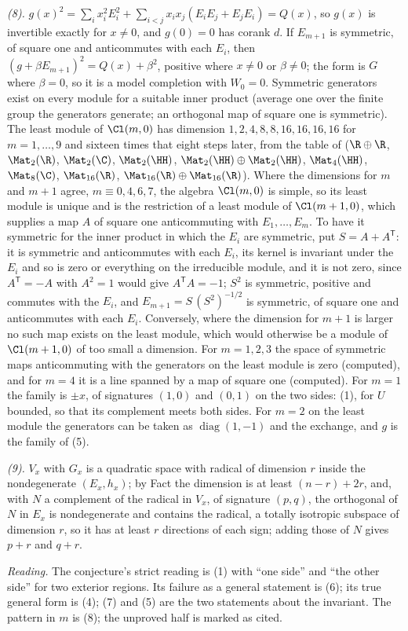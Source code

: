 \emph{(8).} $g(x)^{2} = \sum_{i}x_{i}^{2}E_{i}^{2} + \sum_{i<j}x_{i}x_{j}(E_{i}E_{j} + E_{j}E_{i}) = Q(x)$, so $g(x)$ is invertible exactly for $x \neq 0$, and $g(0) = 0$ has corank $d$. If $E_{m+1}$ is symmetric, of square one and anticommutes with each $E_{i}$, then $(g + \beta E_{m+1})^{2} = Q(x) + \beta^{2}$, positive where $x \neq 0$ or $\beta \neq 0$; the form is $G$ where $\beta = 0$, so it is a model completion with $W_{0} = 0$. Symmetric generators exist on every module for a suitable inner product (average one over the finite group the generators generate; an orthogonal map of square one is symmetric). The least module of $\Cl(m,0)$ has dimension $1, 2, 4, 8, 8, 16, 16, 16, 16$ for $m = 1, \dots, 9$ and sixteen times that eight steps later, from the table of  ($\R \oplus \R$, $\Mat_{2}(\R)$, $\Mat_{2}(\C)$, $\Mat_{2}(\HH)$, $\Mat_{2}(\HH) \oplus \Mat_{2}(\HH)$, $\Mat_{4}(\HH)$, $\Mat_{8}(\C)$, $\Mat_{16}(\R)$, $\Mat_{16}(\R) \oplus \Mat_{16}(\R)$). Where the dimensions for $m$ and $m + 1$ agree, $m \equiv 0, 4, 6, 7$, the algebra $\Cl(m,0)$ is simple, so its least module is unique and is the restriction of a least module of $\Cl(m+1,0)$, which supplies a map $A$ of square one anticommuting with $E_{1}, \dots, E_{m}$. To have it symmetric for the inner product in which the $E_{i}$ are symmetric, put $S = A + A^{\mathsf T}$: it is symmetric and anticommutes with each $E_{i}$, its kernel is invariant under the $E_{i}$ and so is zero or everything on the irreducible module, and it is not zero, since $A^{\mathsf T} = -A$ with $A^{2} = 1$ would give $A^{\mathsf T}A = -1$; $S^{2}$ is symmetric, positive and commutes with the $E_{i}$, and $E_{m+1} = S\,(S^{2})^{-1/2}$ is symmetric, of square one and anticommutes with each $E_{i}$. Conversely, where the dimension for $m + 1$ is larger no such map exists on the least module, which would otherwise be a module of $\Cl(m+1,0)$ of too small a dimension. For $m = 1, 2, 3$ the space of symmetric maps anticommuting with the generators on the least module is zero (computed), and for $m = 4$ it is a line spanned by a map of square one (computed). For $m = 1$ the family is $\pm x$, of signatures $(1,0)$ and $(0,1)$ on the two sides: (1), for $U$ bounded, so that its complement meets both sides. For $m = 2$ on the least module the generators can be taken as $\operatorname{diag}(1,-1)$ and the exchange, and $g$ is the family of (5).

\emph{(9).} $V_{x}$ with $G_{x}$ is a quadratic space with radical of dimension $r$ inside the nondegenerate $(E_{x}, h_{x})$; by Fact  the dimension is at least $(n - r) + 2r$, and, with $N$ a complement of the radical in $V_{x}$, of signature $(p,q)$, the orthogonal of $N$ in $E_{x}$ is nondegenerate and contains the radical, a totally isotropic subspace of dimension $r$, so it has at least $r$ directions of each sign; adding those of $N$ gives $p + r$ and $q + r$.

\emph{Reading.} The conjecture's strict reading is (1) with ``one side'' and ``the other side'' for two exterior regions. Its failure as a general statement is (6); its true general form is (4); (7) and (5) are the two statements about the invariant. The pattern in $m$ is (8); the unproved half is marked as cited.
